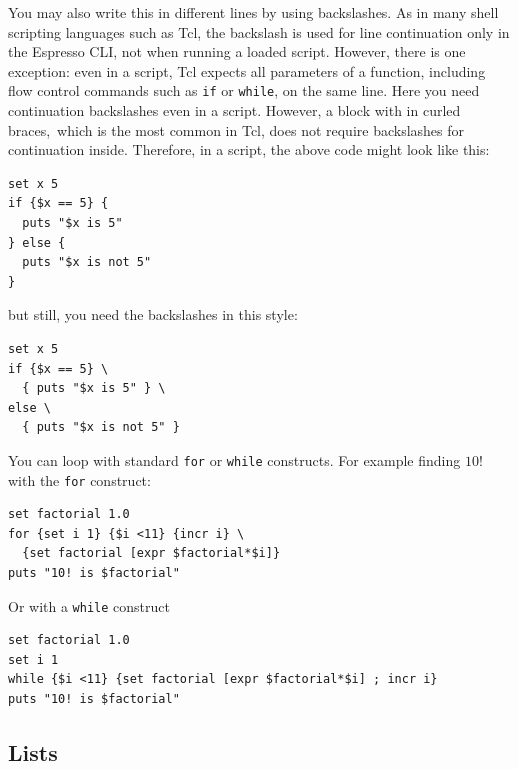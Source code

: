 \documentclass[
paper=a4,                       %
fontsize=11pt,                  %
twoside,                        %
footsepline,                    %
headsepline,                    %
headinclude=false,              %
footinclude=false,              %
pagesize,                       %
]{scrartcl}
\begin{document}
\noindent You may also write this in different lines by using backslashes. As in
many shell scripting languages such as Tcl, the  backslash is
used for line continuation only in the Espresso CLI, not when running a loaded script.
However, there is one exception: even in a script, Tcl expects all parameters of a function,
including flow control commands such as \texttt{if} or \texttt{while}, on the same line. Here
you need continuation backslashes even in a script. However, a block with in curled braces,\
which is the most common in Tcl, does not require backslashes for continuation inside. Therefore,
in a script, the above code might look like this:
{\small\vspace{0,2cm}
\begin{lstlisting}[numbers=none]
set x 5
if {$x == 5} {
  puts "$x is 5"
} else {
  puts "$x is not 5"
}
\end{lstlisting}\vspace{0,2cm}
}
\noindent but still, you need the backslashes in this style:
{\small\vspace{0,2cm}
\begin{lstlisting}[numbers=none]
set x 5
if {$x == 5} \
  { puts "$x is 5" } \
else \
  { puts "$x is not 5" }
\end{lstlisting}\vspace{0,2cm}
}

You can loop with standard \lstinline|for| or \lstinline|while| constructs. 
For example finding $10!$ with the \lstinline|for| construct:
      
{\small\vspace{0,2cm}
\begin{lstlisting}[numbers=none]
set factorial 1.0
for {set i 1} {$i <11} {incr i} \
  {set factorial [expr $factorial*$i]}
puts "10! is $factorial"
\end{lstlisting}\vspace{0,2cm}
}

\noindent Or with a  \lstinline|while| construct

{\small\vspace{0,2cm}
\begin{lstlisting}[numbers=none]
set factorial 1.0
set i 1
while {$i <11} {set factorial [expr $factorial*$i] ; incr i}
puts "10! is $factorial"
\end{lstlisting}\vspace{0,2cm}
 }
 
 \subsection{Lists}
 
\end{document}
